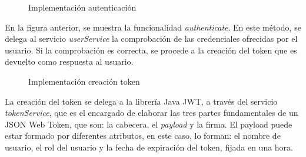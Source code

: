 \begin{figure}[H]
\centering
{}
\caption{Implementación autenticación}
\end{figure}

En la figura anterior, se muestra la funcionalidad \textit{authenticate}. En este método, se delega al servicio \textit{userService} la comprobación de las credenciales ofrecidas por el usuario. Si la comprobación es correcta, se procede a la creación del token que es devuelto como respuesta al usuario.

\begin{figure}[H]
\centering
{}
\caption{Implementación creación token}
\end{figure}

La creación del token se delega a la librería Java JWT, a través del servicio \textit{tokenService}, que es el encargado de elaborar las tres partes fundamentales de un JSON Web Token, que son: la cabecera, el \textit{payload} y la firma. El payload puede estar formado por diferentes atributos, en este caso, lo forman: el nombre de usuario, el rol del usuario y la fecha de expiración del token, fijada en una hora. 




